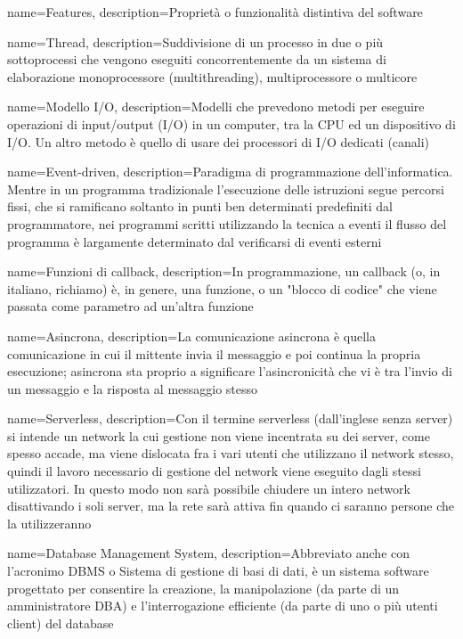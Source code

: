 {
  name=Features,
  description={Proprietà o funzionalità distintiva del software}
}

{
  name=Thread,
  description={Suddivisione di un processo in due o più  sottoprocessi che vengono eseguiti concorrentemente da un sistema di elaborazione monoprocessore (multithreading), multiprocessore o multicore}
}

{
  name=Modello I/O,
  description={Modelli che prevedono metodi per eseguire operazioni di input/output (I/O) in un computer, tra la CPU ed un dispositivo di I/O. Un altro metodo è quello di usare dei processori di I/O dedicati (canali)}
}

{
  name=Event-driven,
  description={Paradigma di programmazione dell'informatica. Mentre in un programma tradizionale l'esecuzione delle istruzioni segue percorsi fissi, che si ramificano soltanto in punti ben determinati predefiniti dal programmatore, nei programmi scritti utilizzando la tecnica a eventi il flusso del programma è largamente determinato dal verificarsi di eventi esterni}
}

{
  name=Funzioni di callback,
  description={In programmazione, un callback (o, in italiano, richiamo) è, in genere, una funzione, o un "blocco di codice" che viene passata come parametro ad un'altra funzione}
}

{
  name=Asincrona,
  description={La comunicazione asincrona è quella comunicazione in cui il mittente invia il messaggio e poi continua la propria esecuzione; asincrona sta proprio a significare l'asincronicità che vi è tra l'invio di un messaggio e la risposta al messaggio stesso}
}

{
  name=Serverless,
  description={Con il termine serverless (dall'inglese senza server) si intende un network la cui gestione non viene incentrata su dei server, come spesso accade, ma viene dislocata fra i vari utenti che utilizzano il network stesso, quindi il lavoro necessario di gestione del network viene eseguito dagli stessi utilizzatori. In questo modo non sarà possibile chiudere un intero network disattivando i soli server, ma la rete sarà attiva fin quando ci saranno persone che la utilizzeranno}
}

{
  name=Database Management System,
  description={Abbreviato anche con l'acronimo DBMS o Sistema di gestione di basi di dati, è un sistema software progettato per consentire la creazione, la manipolazione (da parte di un amministratore DBA) e l'interrogazione efficiente (da parte di uno o più utenti client) del database}
}

